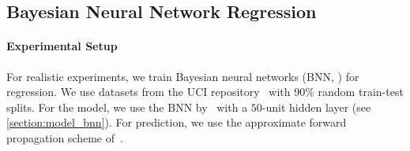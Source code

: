 
% 







  \vspace{-0.1in}
\subsection{Bayesian Neural Network Regression}\label{section:bnn}
  \vspace{-0.07in}
\paragraph{Experimental Setup}
For realistic experiments, we train Bayesian neural networks (BNN, \citealt{neal_bayesian_1996}) for regression.
We use datasets from the UCI repository~\citep{Dua:2019} with 90\% random train-test splits.
For the model, we use the BNN by~\citet{pmlr-v37-hernandez-lobatoc15} with a \(50\)-unit hidden layer (see \cref{section:model_bnn}).
For prediction, we use the approximate forward propagation scheme of~\citet{pmlr-v37-hernandez-lobatoc15}.


